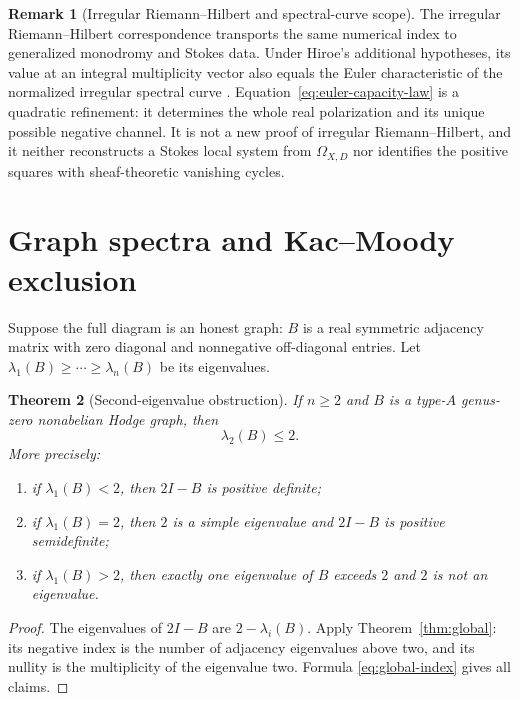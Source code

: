 \documentclass[11pt,a4paper]{amsart}
\theoremstyle{plain}
\newtheorem{theorem}{Theorem}[section]
\theoremstyle{definition}
\newtheorem{remark}[theorem]{Remark}
\begin{document}
\begin{remark}[Irregular Riemann--Hilbert and spectral-curve scope]
The irregular Riemann--Hilbert correspondence transports the same numerical index to generalized
monodromy and Stokes data.  Under Hiroe's additional hypotheses, its value at an integral
multiplicity vector also equals the Euler characteristic of the normalized irregular spectral
curve \cite{Hiroe2019Rigidity}.  Equation~\eqref{eq:euler-capacity-law} is a quadratic refinement:
it determines the whole real polarization and its unique possible negative channel.  It is not a
new proof of irregular Riemann--Hilbert, and it neither reconstructs a Stokes local system from
$\Omega_{X,D}$ nor identifies the positive squares with sheaf-theoretic vanishing cycles.
\end{remark}

\section{Graph spectra and Kac--Moody exclusion}\label{sec:spectral}

Suppose the full diagram is an honest graph: $B$ is a real symmetric adjacency matrix with zero
diagonal and nonnegative off-diagonal entries.  Let
$\lambda_1(B)\ge\cdots\ge\lambda_n(B)$ be its eigenvalues.

\begin{theorem}[Second-eigenvalue obstruction]\label{thm:lambda2}
If $n\ge2$ and $B$ is a type-$A$ genus-zero nonabelian Hodge graph, then
\begin{equation}\label{eq:lambda2}
                         \boxed{\lambda_2(B)\le2.}
\end{equation}
More precisely:
\begin{enumerate}[label=(\roman*),leftmargin=2.2em]
\item if $\lambda_1(B)<2$, then $2I-B$ is positive definite;
\item if $\lambda_1(B)=2$, then $2$ is a simple eigenvalue and $2I-B$ is positive semidefinite;
\item if $\lambda_1(B)>2$, then exactly one eigenvalue of $B$ exceeds $2$ and $2$ is not an
eigenvalue.
\end{enumerate}
\end{theorem}

\begin{proof}
The eigenvalues of $2I-B$ are $2-\lambda_i(B)$.  Apply
Theorem~\ref{thm:global}: its negative index is the number of adjacency eigenvalues above two, and
its nullity is the multiplicity of the eigenvalue two.  Formula \eqref{eq:global-index} gives all
claims.
\end{proof}
\end{document}
